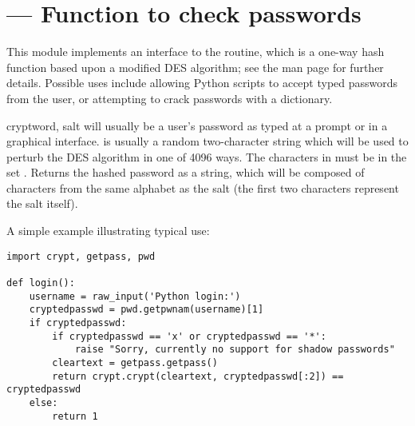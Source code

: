 \section{ ---
         Function to check \UNIX{} passwords}



This module implements an interface to the
 routine, which is a one-way hash
function based upon a modified DES algorithm; see
the \UNIX{} man page for further details.  Possible uses include
allowing Python scripts to accept typed passwords from the user, or
attempting to crack \UNIX{} passwords with a dictionary.

\begin{funcdesc}{crypt}{word, salt} 
   will usually be a user's password as typed at a prompt or 
  in a graphical interface.   is usually a random
  two-character string which will be used to perturb the DES algorithm
  in one of 4096 ways.  The characters in  must be in the
  set \regexp{[./a-zA-Z0-9]}.  Returns the hashed password as a
  string, which will be composed of characters from the same alphabet
   as the salt (the first two characters represent the salt itself).
\end{funcdesc}


A simple example illustrating typical use:

\begin{verbatim}
import crypt, getpass, pwd

def login():
    username = raw_input('Python login:')
    cryptedpasswd = pwd.getpwnam(username)[1]
    if cryptedpasswd:
        if cryptedpasswd == 'x' or cryptedpasswd == '*': 
            raise "Sorry, currently no support for shadow passwords"
        cleartext = getpass.getpass()
        return crypt.crypt(cleartext, cryptedpasswd[:2]) == cryptedpasswd
    else:
        return 1
\end{verbatim}
